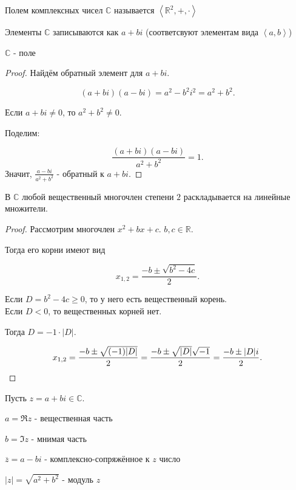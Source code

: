 \begin{definition} 
    Полем комплексных чисел $\mathbb{C}$ называется $\left<\mathbb{R}^2, +, \cdot \right>$

    Элементы $\mathbb{C}$ записываются как $a+bi$ (соответсвуют элементам вида $\left<a, b\right>$)
\end{definition}

\begin{theorem} 
    $\mathbb{C}$ - поле
    \begin{proof}
        Найдём обратный элемент для $a+bi$.

        \[ (a+bi)(a-bi) = a^2-b^2i^2 = a^2+b^2 .\]
        
        Если $a+bi \neq 0$, то $a^2+b^2 \neq 0$.

        Поделим:

        \[ \frac{(a+bi)(a-bi)}{a^2+b^2} = 1 .\]
        Значит, $\frac{a-bi}{a^2+b^2}$ - обратный к $a+bi$.
    \end{proof}
\end{theorem}

\begin{remark} 
    В $\mathbb{C}$ любой вещественный многочлен степени $2$ раскладывается на линейные множители.
    \begin{proof}
        Рассмотрим многочлен $x^2+bx+c$. $b, c\in \mathbb{R}$.

        Тогда его корни имеют вид

        \[ x_{1,2} = \frac{-b \pm \sqrt{b^2-4c} }{2} .\]

        Если $D=b^2-4c \ge 0$, то у него есть вещественный корень.\\

        Если $D < 0$, то вещественных корней нет.

        Тогда $D = -1 \cdot |D|$.

        \[ x_{1, 2} = \frac{-b \pm \sqrt{(-1)|D|} }{2} = \frac{-b \pm \sqrt{|D|}\sqrt{-1}  }{2} = \frac{-b\pm |D|i}{2} .\qedhere\] 
    \end{proof}
\end{remark}

\begin{properties} 
    Пусть $z = a+bi\in \mathbb{C}$.

    $a = \Re z$ - вещественная часть

    $b = \Im z$ - мнимая часть

    $\overline{z} = a-bi$ - комплексно-сопряжённое к $z$ число

    $|z| = \sqrt{a^2+b^2}$ - модуль $z$
\end{properties}

